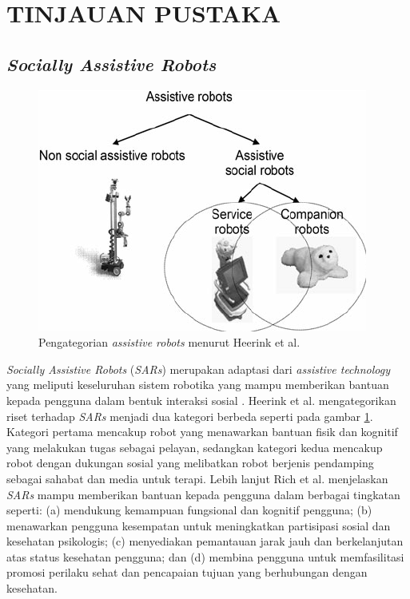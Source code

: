\section{TINJAUAN PUSTAKA}

\subsection{\emph{Socially Assistive Robots}}

\begin{figure} [ht] \centering
	\includegraphics[scale=0.45]{gambar/robots-category.png}
	\caption{Pengategorian \emph{assistive robots} menurut Heerink et al.}
	\label{fig:RobotsCategory}
\end{figure}

\emph{Socially Assistive Robots} (\emph{SARs}) merupakan adaptasi dari \emph{assistive technology} yang meliputi keseluruhan sistem robotika yang mampu memberikan bantuan kepada pengguna dalam bentuk interaksi sosial \citep{Seifer2005}.
Heerink et al. \citep{Heerink2010} mengategorikan riset terhadap \emph{SARs} menjadi dua kategori berbeda seperti pada gambar \ref{fig:RobotsCategory}.
Kategori pertama mencakup robot yang menawarkan bantuan fisik dan kognitif yang melakukan tugas sebagai pelayan, sedangkan kategori kedua mencakup robot dengan dukungan sosial yang melibatkan robot berjenis pendamping sebagai sahabat dan media untuk terapi.
Lebih lanjut Rich et al. \citep{Rich2009} menjelaskan \emph{SARs} mampu memberikan bantuan kepada pengguna dalam berbagai tingkatan seperti:
(a) mendukung kemampuan fungsional dan kognitif pengguna;
(b) menawarkan pengguna kesempatan untuk meningkatkan partisipasi sosial dan kesehatan psikologis;
(c) menyediakan pemantauan jarak jauh dan berkelanjutan atas status kesehatan pengguna;
dan (d) membina pengguna untuk memfasilitasi promosi perilaku sehat dan pencapaian tujuan yang berhubungan dengan kesehatan.

